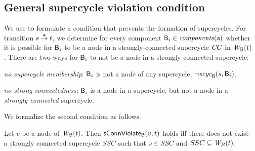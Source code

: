 \subsection{General supercycle violation condition}

We use  to formulate a condition that prevents the formation of
supercycles. 
For transition $s \goesto[\act] t$, we determine for every component $\B_i \in \cmps{\act}$ whether
it is possible for $\B_i$ to be a node in a strongly-connected supercycle $\CC$ in $\wfg{\B}{t}$. 
There are two ways for $\B_i$ to not be a node in a strongly-connected supercycle:
\bn
\item \textit{no supercycle membership}: $\B_i$ is not a node of any supercycle, \ie $\neg \scyc{\B}{s}{\B_i}$.

\item \textit{no strong-connectedness}: $\B_i$ is a node in a supercycle, but not a node in a \emph{strongly-connected} supercycle. 

\en



We formalize the second condition as follows.

\label{def:sConn.violation}
 Let $v$ be a node of $\wfg{\B}{t}$.   Then $\connViol{v}{t}$ holds iff there does not exist a 
strongly connected
 supercycle $SSC$ such that $v \in SSC$ and $SSC \sub \wfg{B}{t}$.
\ed






